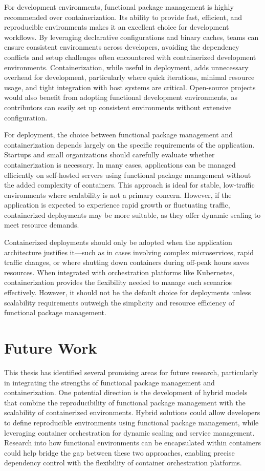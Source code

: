 For development environments, functional package management is highly recommended over 
containerization. Its ability to provide fast, efficient, and reproducible environments 
makes it an excellent choice for development workflows. By leveraging declarative 
configurations and binary caches, teams can ensure consistent environments across developers, 
avoiding the dependency conflicts and setup challenges often encountered with containerized 
development environments. Containerization, while useful in deployment, adds unnecessary 
overhead for development, particularly where quick iterations, minimal resource usage, 
and tight integration with host systems are critical. Open-source projects would also benefit 
from adopting functional development environments, as contributors can easily set up 
consistent environments without extensive configuration.

For deployment, the choice between functional package management and containerization 
depends largely on the specific requirements of the application. Startups and small 
organizations should carefully evaluate whether containerization is necessary. In many 
cases, applications can be managed efficiently on self-hosted servers using functional 
package management without the added complexity of containers. This approach is ideal 
for stable, low-traffic environments where scalability is not a primary concern. However, 
if the application is expected to experience rapid growth or fluctuating traffic, containerized 
deployments may be more suitable, as they offer dynamic scaling to meet resource demands.

Containerized deployments should only be adopted when the application architecture justifies 
it—such as in cases involving complex microservices, rapid traffic changes, or where shutting 
down containers during off-peak hours saves resources. When integrated with orchestration 
platforms like Kubernetes, containerization provides the flexibility needed to manage such 
scenarios effectively. However, it should not be the default choice for deployments unless 
scalability requirements outweigh the simplicity and resource efficiency of functional 
package management.

\section{Future Work}
This thesis has identified several promising areas for future research, particularly in 
integrating the strengths of functional package management and containerization. One potential 
direction is the development of hybrid models that combine the reproducibility of functional 
package management with the scalability of containerized environments. Hybrid solutions could 
allow developers to define reproducible environments using functional package management, 
while leveraging container orchestration for dynamic scaling and service management. Research 
into how functional environments can be encapsulated within containers could help bridge the 
gap between these two approaches, enabling precise dependency control with the flexibility 
of container orchestration platforms.

